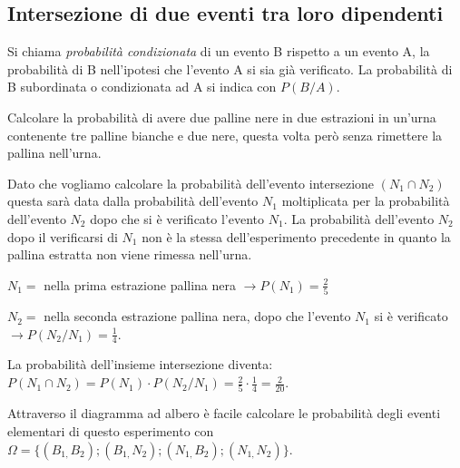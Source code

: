 
\subsection{Intersezione di due eventi tra loro dipendenti}
\begin{definizione}
Si chiama \emph{probabilità condizionata} di un evento B rispetto a un evento 
A, la probabilità di B nell'ipotesi che l'evento A si sia già verificato. 
La probabilità di B subordinata o condizionata ad A si indica con $P(B/A)$.
\end{definizione}

\begin{esempio}
Calcolare la probabilità di avere due palline nere in due estrazioni in un'urna 
contenente tre palline bianche e due nere, questa volta però senza rimettere la 
pallina nell'urna.

Dato che vogliamo calcolare la probabilità dell'evento intersezione $(N_1\cap 
N_2)$ questa sarà data dalla probabilità dell'evento $N_1$ moltiplicata per la 
probabilità dell'evento $N_2$ dopo che si è verificato l'evento $N_1$. La 
probabilità dell'evento $N_2$ dopo il verificarsi di $N_1$ non è la stessa 
dell'esperimento precedente in quanto la pallina estratta non viene rimessa 
nell'urna.
\begin{itemize*}
\item $ N_{1}= $ nella prima estrazione pallina nera $\to P(N_1)=\frac 2 5$
\item$ N_{2}= $ nella seconda estrazione pallina nera, dopo che l'evento $N_1$ 
si è verificato $\to P(N_2/N_1)=\frac 1 4$.
\end{itemize*}
\begin{center}
 
\end{center}
La probabilità dell'insieme intersezione diventa: $P(N_1\cap N_2)=P(N_1)\cdot 
P(N_2/N_1)=\frac 2 5\cdot \frac 1 4=\frac 2{20}$.

Attraverso il diagramma ad albero è facile calcolare le probabilità degli 
eventi elementari di questo esperimento con $\Omega 
=\{(B_{1,}B_2);(B_{1,}N_2);(N_{1,}B_2);(N_{1,}N_2)\}$.
\end{esempio}

